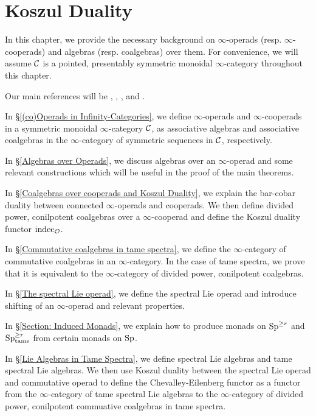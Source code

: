 \chapter{Koszul Duality}

In this chapter, we provide the necessary background on $\infty$-operads (resp. $\infty$-cooperads) and algebras (resp. coalgebras) over them. For convenience, we will assume ${\mathcal{C}}$ is a pointed, presentably symmetric monoidal $\infty$-category throughout this chapter.

Our main references will be \cite{BrantnerPhD},  \cite{Heuts_Koszul}, \cite{Francis-Gaitsgory}, \cite{Hadrianphdthesis} and \cite{HA}.
 
In \S \ref{(co)Operads in Infinity-Categories}, we define $\infty$-operads and $\infty$-cooperads in a symmetric monoidal $\infty$-category ${\mathcal{C}}$, as associative algebras and associative coalgebras in the $\infty$-category of symmetric sequences in ${\mathcal{C}}$, respectively.

In \S \ref{Algebras over Operads}, we discuss algebras over an $\infty$-operad and some relevant constructions which will be useful in the proof of the main theorems. 

In \S \ref{Coalgebras over cooperads and Koszul Duality}, we explain the bar-cobar duality between connected $\infty$-operads and cooperads. We then define divided power, conilpotent coalgebras over a $\infty$-cooperad and define the Koszul duality functor $\operatorname{indec}_{{\mathcal{O}}}$.

In \S \ref{Commutative coalgebras in tame spectra}, we define the $\infty$-category of commutative coalgebras in an $\infty$-category. In the case of tame spectra, we prove that it is equivalent to the $\infty$-category of divided power, conilpotent coalgebras.

In \S \ref{The spectral Lie operad}, we define the spectral Lie operad and introduce shifting of an $\infty$-operad and relevant properties.

In \S \ref{Section: Induced Monads}, we explain how to produce monads on $\operatorname{Sp}^{\geq r}$ and $\operatorname{Sp}^{\geq r}_{\operatorname{\operatorname{tame}}}$ from certain monads on $\operatorname{Sp}$.

In \S \ref{Lie Algebras in Tame Spectra}, we define spectral Lie algebras and tame spectral Lie algebras. We then use Koszul duality between the spectral Lie operad and commutative operad to define the Chevalley-Eilenberg functor as a functor from the $\infty$-category of tame spectral Lie algebras to the $\infty$-category of divided power, conilpotent commuative coalgebras in tame spectra.




